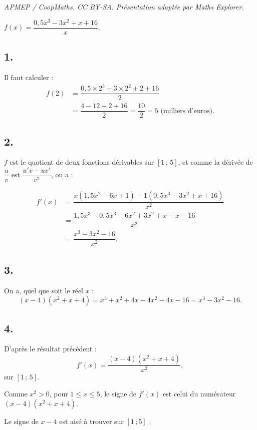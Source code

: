 \documentclass[10pt]{article}
\begin{document}
\noindent\textit{APMEP / CoopMaths. CC BY-SA. Présentation adaptée par Maths Explorer.}\par\medskip
\( f(x) = \dfrac{0{,}5x^3 - 3x^2 + x + 16}{x} \).

\subsection*{1.}

Il faut calculer :
\begin{align*}
f(2) &= \dfrac{0{,}5 \times 2^3 - 3 \times 2^2 + 2 + 16}{2} \\
&= \dfrac{4 - 12 + 2 + 16}{2} = \dfrac{10}{2} = 5 \text{ (milliers d'euros)}.
\end{align*}

\subsection*{2.}

\( f \) est le quotient de deux fonctions dérivables sur \([1 \,;\, 5]\), et comme la dérivée de \( \dfrac{u}{v} \) est \( \dfrac{u' v - u v'}{v^2} \), on a :

\begin{align*}
f'(x) &= \dfrac{x \left( 1{,}5x^2 - 6x + 1 \right) - 1 \left( 0{,}5x^3 - 3x^2 + x + 16 \right)}{x^2} \\
&= \dfrac{1{,}5x^3 - 0{,}5x^3 - 6x^2 + 3x^2 + x - x - 16}{x^2} \\
&= \dfrac{x^3 - 3x^2 - 16}{x^2}.
\end{align*}

\subsection*{3.}

On a, quel que soit le réel \(x\) :
\[
(x - 4)(x^2 + x + 4) = x^3 + x^2 + 4x - 4x^2 - 4x - 16 = x^3 - 3x^2 - 16.
\]

\subsection*{4.}

D'après le résultat précédent :
\[
f'(x) = \dfrac{(x - 4)(x^2 + x + 4)}{x^2},
\]
sur \([1 \,;\, 5]\).

Comme \( x^2 > 0 \), pour \( 1 \leqslant x \leqslant 5 \), le signe de \( f'(x) \) est celui du numérateur \( (x - 4)(x^2 + x + 4) \).

Le signe de \( x - 4 \) est aisé à trouver sur \( [1 \, ; 5] \) ;
\end{document}
